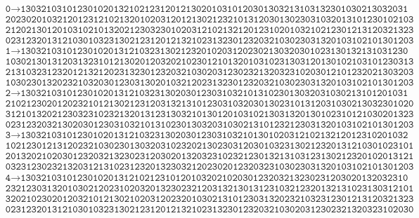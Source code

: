 \documentclass[final]{dmtcs-episciences}
\theoremstyle{plain}
\theoremstyle{definition}
\theoremstyle{remark}
\begin{document}
{\footnotesize
\begin{align*}
 &\texttt{0}\rightarrow\texttt{130321031012301020132102123120121302010310120301303213103132301030213032031}\\ &\texttt{2023020103212012312102132010203120121302123210131203013023031032013101230102103}\\ &\texttt{2120213012010310210132021230323010203121021321201231020103210212301213120321323}\\ &\texttt{0231232013121030103231302123120121321023132301232032103023031320103102101301203}\\ 
 &\texttt{1}\rightarrow\texttt{130321031012301020131210323130212320102031202302130320301023130132131031230}\\ &\texttt{1030213013120313231012130201203202102301210132010310231303120130102103101230313}\\ &\texttt{2131032312320121321202313230123203210302031230232132032310203012101232021303203}\\ &\texttt{1030230132023210320301230313020103212023132301232032103023031320103102101301203}\\ 
 &\texttt{2}\rightarrow\texttt{130321031012301020131210323130203012303103210131023013032031030213101201031}\\ &\texttt{2102123020120232101213021231203132131012303103203013023101312031030213032301020}\\ &\texttt{3121013202123032310232132013123130321013012010310213031320130102310121030201323}\\ &\texttt{0231232032130203012303103210131023013032031030213101232123031320103102101301203}\\ 
 &\texttt{3}\rightarrow\texttt{130321031012301020131210323130203012303103210130102031210213212012310201032}\\ &\texttt{1021230121312023210302301303203102320213023031203010323130212320131210301023101}\\ &\texttt{2013202102030123203213230231203020132032310232123013213103123130212320102013121}\\ &\texttt{0323123023213203121310231232013230321202302012320323103023031320103102101301203}\\ 
 &\texttt{4}\rightarrow\texttt{130321031012301020131210212310120103202102030123203213230231203020132032310}\\ &\texttt{2321230313201030212023102032013230232120313213013123103212320132131023130312101}\\ &\texttt{3202102302012032101213021020312023201030213101230313202321032312301213120321323}\\ &\texttt{0231232013121030103231302123120121321023132301232032103020312302321320323102030}\\ 

\end{align*}}
\end{document}
